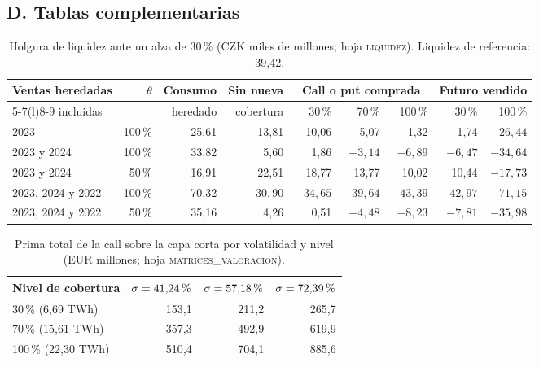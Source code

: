 \documentclass[11pt,letterpaper]{article}
\theoremstyle{plain}
\theoremstyle{definition}
\theoremstyle{remark}
\numberwithin{equation}{section}
\newcommand{\pc}{\mbox{\,\%}}
\begin{document}
\subsection*{D. Tablas complementarias}

\begin{table}[H]
\centering\small
\caption{Holgura de liquidez ante un alza de 30\pc{} (CZK miles de millones; hoja \textsc{liquidez}). Liquidez de referencia: 39,42.}\label{tab:holgura}
\begin{tabular}{@{}lrrrrrrrr@{}}
\toprule
Ventas heredadas & $\theta$ & Consumo & Sin nueva & \multicolumn{3}{c}{Call o put comprada} & \multicolumn{2}{c}{Futuro vendido}\\
\cmidrule(lr){5-7}\cmidrule(l){8-9}
incluidas & & heredado & cobertura & 30\pc{} & 70\pc{} & 100\pc{} & 30\pc{} & 100\pc{}\\
\midrule
2023 & 100\pc{} & 25,61 & 13,81 & 10,06 & 5,07 & 1,32 & 1,74 & $-26{,}44$\\
2023 y 2024 & 100\pc{} & 33,82 & 5,60 & 1,86 & $-3{,}14$ & $-6{,}89$ & $-6{,}47$ & $-34{,}64$\\
2023 y 2024 & 50\pc{} & 16,91 & 22,51 & 18,77 & 13,77 & 10,02 & 10,44 & $-17{,}73$\\
2023, 2024 y 2022 & 100\pc{} & 70,32 & $-30{,}90$ & $-34{,}65$ & $-39{,}64$ & $-43{,}39$ & $-42{,}97$ & $-71{,}15$\\
2023, 2024 y 2022 & 50\pc{} & 35,16 & 4,26 & 0,51 & $-4{,}48$ & $-8{,}23$ & $-7{,}81$ & $-35{,}98$\\
\bottomrule
\end{tabular}
\end{table}

\begin{table}[H]
\centering\small
\caption{Prima total de la call sobre la capa corta por volatilidad y nivel (EUR millones; hoja \textsc{matrices\_valoracion}).}\label{tab:matriz}
\begin{tabular}{@{}lrrr@{}}
\toprule
Nivel de cobertura & $\sigma=41{,}24\pc{}$ & $\sigma=57{,}18\pc{}$ & $\sigma=72{,}39\pc{}$\\
\midrule
30\pc{} (6,69 TWh) & 153,1 & 211,2 & 265,7\\
70\pc{} (15,61 TWh) & 357,3 & 492,9 & 619,9\\
100\pc{} (22,30 TWh) & 510,4 & 704,1 & 885,6\\
\bottomrule
\end{tabular}
\end{table}
\end{document}
